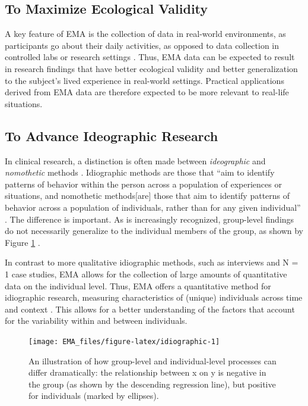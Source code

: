 \documentclass[]{book}
\begin{document}
\subsection{To Maximize Ecological
Validity}\label{to-maximize-ecological-validity}


A key feature of EMA is the collection of data in real-world
environments, as participants go about their daily activities, as
opposed to data collection in controlled labs or research settings
\citep{Shiffman2008}. Thus, EMA data can be expected to result in
research findings that have better ecological validity and better
generalization to the subject's lived experience in real-world settings.
Practical applications derived from EMA data are therefore expected to
be more relevant to real-life situations.

\subsection{To Advance Ideographic
Research}\label{to-advance-ideographic-research}

 

In clinical research, a distinction is often made between
\emph{ideographic} and \emph{nomothetic} methods \citep{allport1937}.
Idiographic methods are those that ``aim to identify patterns of
behavior within the person across a population of experiences or
situations, and nomothetic methods{[}are{]} those that aim to identify
patterns of behavior across a population of individuals, rather than for
any given individual'' \citep{Conner2009}. The difference is important.
As is increasingly recognized, group-level findings do not necessarily
generalize to the individual members of the group, as shown by Figure
\ref{fig:idiographic} \citep{Hamaker2012}.

In contrast to more qualitative idiographic methods, such as interviews
and N = 1 case studies, EMA allows for the collection of large amounts
of quantitative data on the individual level. Thus, EMA offers a
quantitative method for idiographic research, measuring characteristics
of (unique) individuals across time and context \citep{Shiffman2008}.
This allows for a better understanding of the factors that account for
the variability within and between individuals.

\begin{figure}

{\centering \texttt{[image: EMA\_files/figure-latex/idiographic-1]} 

}

\caption{An illustration of how group-level and individual-level processes can differ dramatically: the relationship between x on y is negative in the group (as shown by the descending regression line), but positive for individuals (marked by ellipses).}\label{fig:idiographic}
\end{figure}
\end{document}
